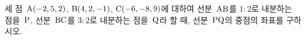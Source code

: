 세 점~$\mathrm{A}(-2{,}\mkern3mu\mathopen{}5{,}\mkern3mu\mathopen{}2)$, $\mathrm{B}(4{,}\mkern3mu\mathopen{}2{,}\mkern3mu\mathopen{}-1)$, $\mathrm{C}(-6{,}\mkern3mu\mathopen{}-8{,}\mkern3mu\mathopen{}9)$에 대하여 선분~$\mathrm{AB}$를 $1:2$로 내분하는 점을~$\mathrm{P}$, 선분~$\mathrm{BC}$를 $3:2$로 내분하는 점을~$\mathrm{Q}$라 할 때, 선분~$\mathrm{PQ}$의 중점의 좌표를 구하시오.
